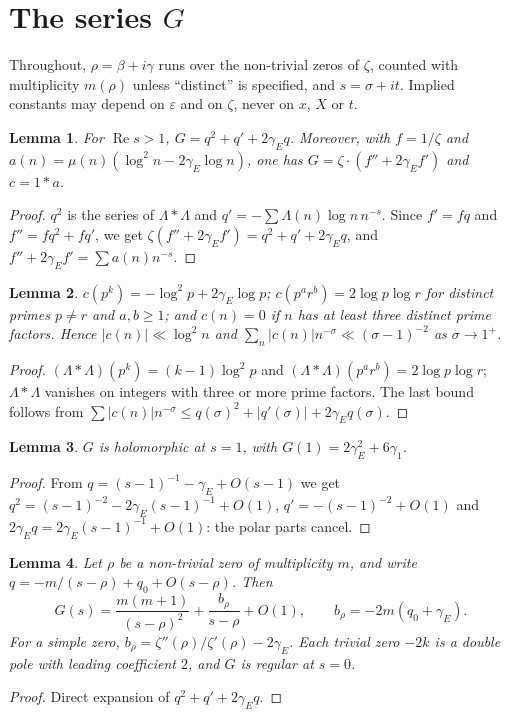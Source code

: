 \documentclass[11pt]{amsart}
\newtheorem{lemma}{Lemma}[section]
\theoremstyle{remark}
\theoremstyle{definition}
\newcommand{\Lam}{\Lambda}
\newcommand{\gE}{\gamma_E}
\renewcommand{\Re}{\operatorname{Re}}
\begin{document}
\section{The series $G$}\label{sec:G}

Throughout, $\rho=\beta+i\gamma$ runs over the non-trivial zeros of $\zeta$, counted with multiplicity $m(\rho)$ unless ``distinct'' is specified, and $s=\sigma+it$. Implied constants may depend on $\varepsilon$ and on $\zeta$, never on $x$, $X$ or $t$.

\begin{lemma}\label{lem:gen}
For $\Re s>1$, $G=q^2+q'+2\gE q$. Moreover, with $f=1/\zeta$ and $a(n)=\mu(n)(\log^2n-2\gE\log n)$, one has $G=\zeta\cdot(f''+2\gE f')$ and $c=1*a$.
\end{lemma}
\begin{proof}
$q^2$ is the series of $\Lam*\Lam$ and $q'=-\sum\Lam(n)\log n\,n^{-s}$. Since $f'=fq$ and $f''=fq^2+fq'$, we get $\zeta(f''+2\gE f')=q^2+q'+2\gE q$, and $f''+2\gE f'=\sum a(n)n^{-s}$.
\end{proof}

\begin{lemma}\label{lem:support}
$c(p^k)=-\log^2p+2\gE\log p$; $c(p^ar^b)=2\log p\log r$ for distinct primes $p\ne r$ and $a,b\ge1$; and $c(n)=0$ if $n$ has at least three distinct prime factors. Hence $|c(n)|\ll\log^2n$ and $\sum_n|c(n)|n^{-\sigma}\ll(\sigma-1)^{-2}$ as $\sigma\to1^+$.
\end{lemma}
\begin{proof}
$(\Lam*\Lam)(p^k)=(k-1)\log^2p$ and $(\Lam*\Lam)(p^ar^b)=2\log p\log r$; $\Lam*\Lam$ vanishes on integers with three or more prime factors. The last bound follows from $\sum|c(n)|n^{-\sigma}\le q(\sigma)^2+|q'(\sigma)|+2\gE q(\sigma)$.
\end{proof}

\begin{lemma}\label{lem:one}
$G$ is holomorphic at $s=1$, with $G(1)=2\gE^2+6\gamma_1$.
\end{lemma}
\begin{proof}
From $q=(s-1)^{-1}-\gE+O(s-1)$ we get $q^2=(s-1)^{-2}-2\gE(s-1)^{-1}+O(1)$, $q'=-(s-1)^{-2}+O(1)$ and $2\gE q=2\gE(s-1)^{-1}+O(1)$: the polar parts cancel.
\end{proof}

\begin{lemma}\label{lem:poles}
Let $\rho$ be a non-trivial zero of multiplicity $m$, and write $q=-m/(s-\rho)+q_0+O(s-\rho)$. Then
\[
G(s)=\frac{m(m+1)}{(s-\rho)^2}+\frac{b_\rho}{s-\rho}+O(1),\qquad b_\rho=-2m(q_0+\gE).
\]
For a simple zero, $b_\rho=\zeta''(\rho)/\zeta'(\rho)-2\gE$. Each trivial zero $-2k$ is a double pole with leading coefficient $2$, and $G$ is regular at $s=0$.
\end{lemma}
\begin{proof}
Direct expansion of $q^2+q'+2\gE q$.
\end{proof}
\end{document}

